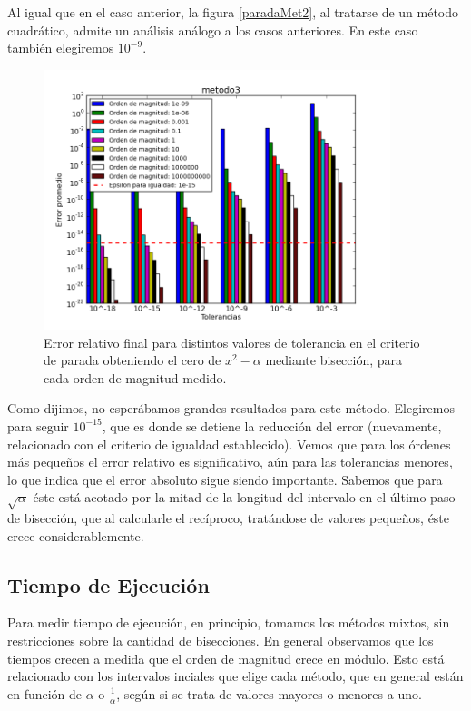 Al igual que en el caso anterior, la figura \ref{paradaMet2}, al tratarse de un método cuadrático, admite un análisis análogo a los casos anteriores. En este caso también elegiremos $10^{-9}$.

\begin{figure}[H]
  \centering
    \includegraphics[width=0.9\textwidth]{../data/metodo3.png}
    \caption{Error relativo final para distintos valores de tolerancia en el criterio de parada obteniendo el cero de $x^2 - \alpha$ mediante bisección, para cada orden de magnitud medido.}
    \label{paradaMet3}
\end{figure}

Como dijimos, no esperábamos grandes resultados para este método. Elegiremos para seguir $10^{-15}$, que es donde se detiene la reducción del error (nuevamente, relacionado con el criterio de igualdad establecido). Vemos que para los órdenes más pequeños el error relativo es significativo, aún para las tolerancias menores, lo que indica que el error absoluto sigue siendo importante. Sabemos que para $\sqrt{\alpha}$ éste está acotado por la mitad de la longitud del intervalo en el último paso de bisección, que al calcularle el recíproco, tratándose de valores pequeños, éste crece considerablemente.

\subsection{Tiempo de Ejecución}

Para medir tiempo de ejecución, en principio, tomamos los métodos mixtos, sin restricciones sobre la cantidad de bisecciones. En general observamos que los tiempos crecen a medida que el orden de magnitud crece en módulo. Esto está relacionado con los intervalos inciales que elige cada método, que en general están en función de $\alpha$ o $\frac{1}{\alpha}$, según si se trata de valores mayores o menores a uno.
 
